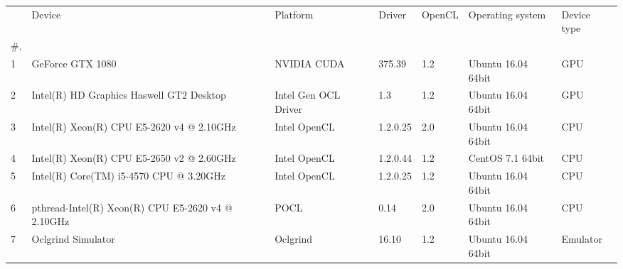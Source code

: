\begin{tabular}{lllllll}
\toprule
{} &                                             Device &              Platform &    Driver & OpenCL &    Operating system & Device type \\
\#. &                                                    &                       &           &        &                     &             \\
\midrule
1  &                                   GeForce GTX 1080 &           NVIDIA CUDA &    375.39 &    1.2 &  Ubuntu 16.04 64bit &         GPU \\
2  &           Intel(R) HD Graphics Haswell GT2 Desktop &  Intel Gen OCL Driver &       1.3 &    1.2 &  Ubuntu 16.04 64bit &         GPU \\
3  &          Intel(R) Xeon(R) CPU E5-2620 v4 @ 2.10GHz &          Intel OpenCL &  1.2.0.25 &    2.0 &  Ubuntu 16.04 64bit &         CPU \\
4  &          Intel(R) Xeon(R) CPU E5-2650 v2 @ 2.60GHz &          Intel OpenCL &  1.2.0.44 &    1.2 &    CentOS 7.1 64bit &         CPU \\
5  &            Intel(R) Core(TM) i5-4570 CPU @ 3.20GHz &          Intel OpenCL &  1.2.0.25 &    1.2 &  Ubuntu 16.04 64bit &         CPU \\
6  &  pthread-Intel(R) Xeon(R) CPU E5-2620 v4 @ 2.10GHz &                  POCL &      0.14 &    2.0 &  Ubuntu 16.04 64bit &         CPU \\
7  &                                 Oclgrind Simulator &              Oclgrind &     16.10 &    1.2 &  Ubuntu 16.04 64bit &    Emulator \\
\bottomrule
\end{tabular}
